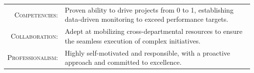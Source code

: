 
\begin{tabular}{rl}
    \textsc{Competencies:} & Proven ability to drive projects from 0 to 1, establishing data-driven monitoring to exceed performance targets. \\
    \textsc{Collaboration:} & Adept at mobilizing cross-departmental resources to ensure the seamless execution of complex initiatives. \\ 
    \textsc{Professionalism:} & Highly self-motivated and responsible, with a proactive approach and committed to excellence.\\
\end{tabular}